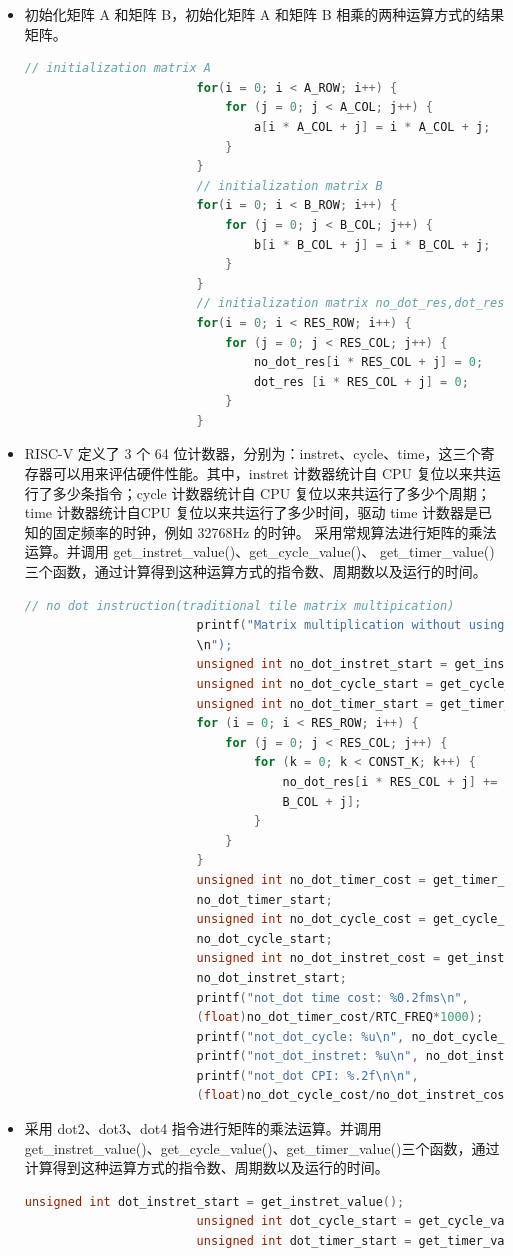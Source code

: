 \documentclass[a4paper, 14pt, oneside]{book} %
\numberwithin{equation}{subsection}
\begin{document}
\begin{enumerate}
\begin{itemize}
\begin{lstlisting}[language={C++}]
					\end{lstlisting}
					\item 初始化矩阵 A 和矩阵 B，初始化矩阵 A 和矩阵 B 相乘的两种运算方式的结果矩阵。
					\begin{lstlisting}[language={C++}]
						// initialization matrix A
						for(i = 0; i < A_ROW; i++) {
							for (j = 0; j < A_COL; j++) {
								a[i * A_COL + j] = i * A_COL + j;
							}
						}
						// initialization matrix B
						for(i = 0; i < B_ROW; i++) {
							for (j = 0; j < B_COL; j++) {
								b[i * B_COL + j] = i * B_COL + j;
							}
						}
						// initialization matrix no_dot_res,dot_res
						for(i = 0; i < RES_ROW; i++) {
							for (j = 0; j < RES_COL; j++) {
								no_dot_res[i * RES_COL + j] = 0;
								dot_res [i * RES_COL + j] = 0;
							}
						}		
					\end{lstlisting}
					\item RISC-V 定义了 3 个 64 位计数器，分别为：instret、cycle、time，这三个寄存器可以用来评估硬件性能。其中，instret 计数器统计自 CPU 复位以来共运行了多少条指令；cycle 计数器统计自 CPU 复位以来共运行了多少个周期；time 计数器统计自CPU 复位以来共运行了多少时间，驱动 time 计数器是已知的固定频率的时钟，例如 32768Hz 的时钟。
					采用常规算法进行矩阵的乘法运算。并调用 get\_instret\_value()、get\_cycle\_value()、
					get\_timer\_value() 三个函数，通过计算得到这种运算方式的指令数、周期数以及运行的时间。
					\begin{lstlisting}[language={C++}]
						// no dot instruction(traditional tile matrix multipication)
						printf("Matrix multiplication without using custom DOT instruction:
						\n");
						unsigned int no_dot_instret_start = get_instret_value();
						unsigned int no_dot_cycle_start = get_cycle_value();
						unsigned int no_dot_timer_start = get_timer_value();
						for (i = 0; i < RES_ROW; i++) {
							for (j = 0; j < RES_COL; j++) {
								for (k = 0; k < CONST_K; k++) {
									no_dot_res[i * RES_COL + j] += a[i * A_COL + k] * b[k *
									B_COL + j];
								}
							}
						}
						unsigned int no_dot_timer_cost = get_timer_value() -
						no_dot_timer_start;
						unsigned int no_dot_cycle_cost = get_cycle_value() -
						no_dot_cycle_start;
						unsigned int no_dot_instret_cost = get_instret_value() -
						no_dot_instret_start;
						printf("not_dot time cost: %0.2fms\n",
						(float)no_dot_timer_cost/RTC_FREQ*1000);
						printf("not_dot_cycle: %u\n", no_dot_cycle_cost);
						printf("not_dot_instret: %u\n", no_dot_instret_cost);
						printf("not_dot CPI: %.2f\n\n",
						(float)no_dot_cycle_cost/no_dot_instret_cost);	
					\end{lstlisting}
					\item 采用 dot2、dot3、dot4 指令进行矩阵的乘法运算。并调用 get\_instret\_value()、get\_cycle\_value()、get\_timer\_value()三个函数，通过计算得到这种运算方式的指令数、周期数以及运行的时间。
					\begin{lstlisting}[language={C++}]
						unsigned int dot_instret_start = get_instret_value();
						unsigned int dot_cycle_start = get_cycle_value();
						unsigned int dot_timer_start = get_timer_value(); 
						

\end{lstlisting}
\end{itemize}
\end{enumerate}
\end{document}
